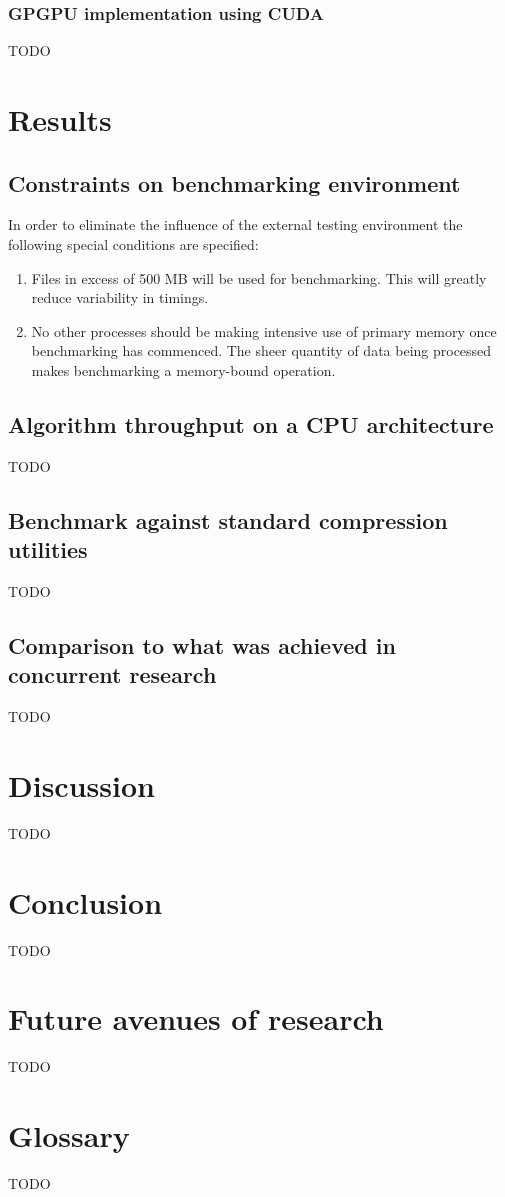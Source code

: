   \subsubsection{GPGPU implementation using CUDA}
  {\color{red}TODO}  
\section{Results}
\subsection{Constraints on benchmarking environment}
In order to eliminate the influence of the external testing environment the following special conditions are specified:
\begin{enumerate}
 \item Files in excess of 500 MB will be used for benchmarking. This will greatly reduce variability in timings.
 \item No other processes should be making intensive use of primary memory once benchmarking has commenced. The sheer quantity of data being processed makes benchmarking a memory-bound operation.
\end{enumerate}
\subsection{Algorithm throughput on a CPU architecture}
{\color{red}TODO}
\subsection{Benchmark against standard compression utilities}
{\color{red}TODO}
\subsection{Comparison to what was achieved in concurrent research}
{\color{red}TODO}
\section{Discussion}
{\color{red}TODO}
\section{Conclusion}
{\color{red}TODO}
\section{Future avenues of research}
{\color{red}TODO}
\section{Glossary}
{\color{red}TODO}


